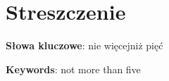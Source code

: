 \section*{Streszczenie}

\bigskip

\textbf{Słowa kluczowe}: \quad nie \quad więcej\quad niż \quad pięć

\textbf{Keywords}: \quad not \quad more \quad than \quad five




